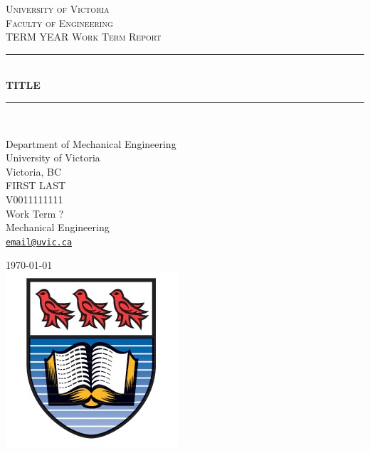\documentclass[12pt]{article}
\newcommand{\email}[1]{\href{mailto:#1}{\texttt{#1}}}
\begin{document}
\begin{titlepage}
\newcommand{\HRule}{\rule{\linewidth}{0.5mm}} 
\center 

\textsc{\LARGE University of Victoria}\\[0.25cm]
\textsc{\Large Faculty of Engineering}\\[0.5cm]
\textsc{\large TERM YEAR Work Term Report}\\[0.5cm] %

\HRule \\[0.4cm]
{ \huge \bfseries TITLE}\\ %
\HRule \\[1 cm]
 
\begin{center}\large
Department of Mechanical Engineering\\
University of Victoria\\
Victoria, BC\\[1cm]

FIRST \textsc{LAST}	\\ %
V0011111111	\\
Work Term ?	\\
Mechanical Engineering\\
\email{email@uvic.ca}\\[1cm]
\end{center}


{\large \today}\\[0.5cm] %

\includegraphics{UVic_logo}\\[0.5cm]



\end{titlepage}
\end{document}
